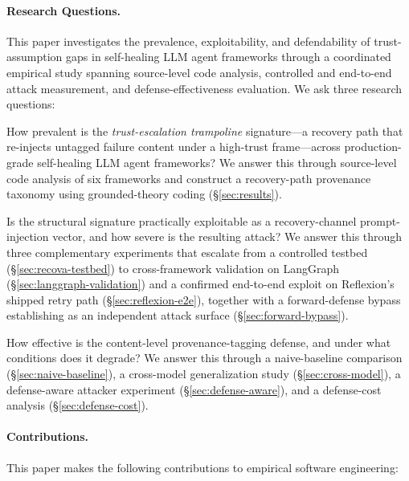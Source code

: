 \paragraph{Research Questions.}
This paper investigates the prevalence, exploitability, and defendability of trust-assumption gaps in self-healing LLM agent frameworks through a coordinated empirical study spanning source-level code analysis, controlled and end-to-end attack measurement, and defense-effectiveness evaluation. We ask three research questions:

\begin{description}[leftmargin=*]
    \item[\textbf{RQ1} (Prevalence).] How prevalent is the \emph{trust-escalation trampoline} signature---a recovery path that re-injects untagged failure content under a high-trust frame---across production-grade self-healing LLM agent frameworks? We answer this through source-level code analysis of six frameworks and construct a recovery-path provenance taxonomy using grounded-theory coding (\S\ref{sec:results}).
    \item[\textbf{RQ2} (Exploitability and Severity).] Is the structural signature practically exploitable as a recovery-channel prompt-injection vector, and how severe is the resulting attack? We answer this through three complementary experiments that escalate from a controlled testbed (\S\ref{sec:recova-testbed}) to cross-framework validation on LangGraph (\S\ref{sec:langgraph-validation}) and a confirmed end-to-end exploit on Reflexion's shipped retry path (\S\ref{sec:reflexion-e2e}), together with a forward-defense bypass establishing \rci{} as an independent attack surface (\S\ref{sec:forward-bypass}).
    \item[\textbf{RQ3} (Defense Effectiveness).] How effective is the content-level \trustorigin{} provenance-tagging defense, and under what conditions does it degrade? We answer this through a naive-baseline comparison (\S\ref{sec:naive-baseline}), a cross-model generalization study (\S\ref{sec:cross-model}), a defense-aware attacker experiment (\S\ref{sec:defense-aware}), and a defense-cost analysis (\S\ref{sec:defense-cost}).
\end{description}

\paragraph{Contributions.}
This paper makes the following contributions to empirical software engineering:

